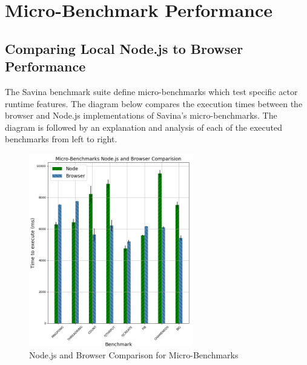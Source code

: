 \documentclass[12pt, a4paper]{report}
\theoremstyle{definition}
\theoremstyle{definition}%
\theoremstyle{definition}%
\theoremstyle{definition}%
\theoremstyle{definition}%
\theoremstyle{definition}%
\begin{document}
\section{Micro-Benchmark Performance}
\subsection{Comparing Local Node.js to Browser Performance}
The Savina benchmark suite define micro-benchmarks which test specific actor runtime features. The diagram below compares the execution times between the browser and Node.js implementations of Savina's micro-benchmarks. The diagram is followed by an explanation and analysis of each of the executed benchmarks from left to right.
\begin{figure}[H]
    \begin{centering}
        \includegraphics[width=270px]{resources/micro.png}
        \caption{Node.js and Browser Comparison for Micro-Benchmarks}
    \end{centering}
\end{figure}
\end{document}
